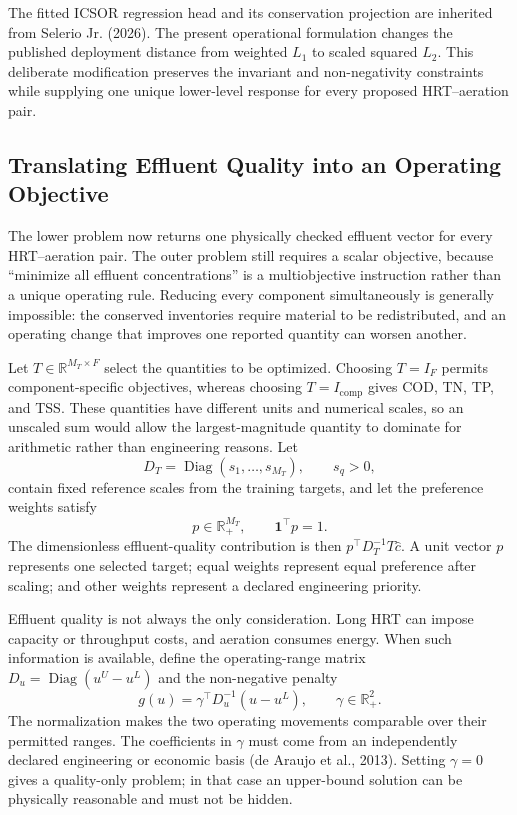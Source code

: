 \documentclass[a4paper,fleqn]{cas-sc}
\newcommand{\R}{\mathbb{R}}
\begin{document}
The fitted ICSOR regression head and its conservation projection are inherited from Selerio Jr. (2026). The present operational formulation changes the published deployment distance from weighted $L_1$ to scaled squared $L_2$. This deliberate modification preserves the invariant and non-negativity constraints while supplying one unique lower-level response for every proposed HRT--aeration pair.

\subsection{Translating Effluent Quality into an Operating Objective}

The lower problem now returns one physically checked effluent vector for every HRT--aeration pair. The outer problem still requires a scalar objective, because ``minimize all effluent concentrations'' is a multiobjective instruction rather than a unique operating rule. Reducing every component simultaneously is generally impossible: the conserved inventories require material to be redistributed, and an operating change that improves one reported quantity can worsen another.

Let $T\in\R^{M_T\times F}$ select the quantities to be optimized. Choosing $T=I_F$ permits component-specific objectives, whereas choosing $T=I_{\mathrm{comp}}$ gives COD, TN, TP, and TSS. These quantities have different units and numerical scales, so an unscaled sum would allow the largest-magnitude quantity to dominate for arithmetic rather than engineering reasons. Let
\begin{equation}
\label{eq:objective_scaling}
D_T=\operatorname{Diag}(s_1,\ldots,s_{M_T}),
\qquad s_q>0,
\end{equation}
contain fixed reference scales from the training targets, and let the preference weights satisfy
\begin{equation}
\label{eq:objective_weights}
p\in\R_+^{M_T},
\qquad
\mathbf1^\top p=1.
\end{equation}
The dimensionless effluent-quality contribution is then $p^\top D_T^{-1}T\widehat c$. A unit vector $p$ represents one selected target; equal weights represent equal preference after scaling; and other weights represent a declared engineering priority.

Effluent quality is not always the only consideration. Long HRT can impose capacity or throughput costs, and aeration consumes energy. When such information is available, define the operating-range matrix $D_u=\operatorname{Diag}(u^U-u^L)$ and the non-negative penalty
\begin{equation}
\label{eq:operating_penalty}
g(u)=\gamma^\top D_u^{-1}(u-u^L),
\qquad
\gamma\in\R_+^2.
\end{equation}
The normalization makes the two operating movements comparable over their permitted ranges. The coefficients in $\gamma$ must come from an independently declared engineering or economic basis (de Araujo et al., 2013). Setting $\gamma=0$ gives a quality-only problem; in that case an upper-bound solution can be physically reasonable and must not be hidden.
\end{document}
